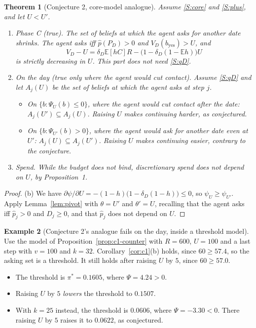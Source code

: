 \documentclass[11pt,a4paper]{article}
\newtheorem{theorem}{Theorem}
\theoremstyle{definition}
\newtheorem{example}[theorem]{Example}
\theoremstyle{remark}
\newcommand{\E}{\mathbb{E}}
\newcommand{\pp}{\hat p}
\begin{document}
\begin{theorem}[Conjecture 2, core-model analogue]\label{thm:c2}
Assume \ref{S:core} and \ref{S:plus}, and let $U<U'$.
\begin{enumerate}[label=(\alph*)]
\item \emph{Phase C (true).} The set of beliefs at which the agent asks for another date shrinks. The agent asks iff $\pp(P_D)>0$ and $V_D(b_{\mathrm{yes}})>U$, and
\[
V_D-U=\delta_D\E[hC]R-\bigl(1-\delta_D(1-\E h)\bigr)U
\]
is strictly decreasing in $U$. This part does not need \ref{S:qD}.
\item \emph{On the day (true only where the agent would cut contact).} Assume \ref{S:qD} and let $A_j(U)$ be the set of beliefs at which the agent asks at step $j$.
\begin{itemize}[nosep]
\item On $\{b:\Psi_U(b)\le0\}$, where the agent would cut contact after the date: $A_j(U')\subseteq A_j(U)$. Raising $U$ makes continuing harder, as conjectured.
\item On $\{b:\Psi_{U'}(b)>0\}$, where the agent would ask for another date even at $U'$: $A_j(U)\subseteq A_j(U')$. Raising $U$ makes continuing \emph{easier}, contrary to the conjecture.
\end{itemize}
\item \emph{Spend.} While the budget does not bind, discretionary spend does not depend on $U$, by Proposition~1.
\end{enumerate}
\end{theorem}

\begin{proof}
(b) We have $\partial\psi/\partial U=-(1-h)\bigl(1-\delta_D(1-h)\bigr)\le0$, so $\psi_U\ge\psi_{U'}$. Apply Lemma~\ref{lem:pivot} with $\theta=U'$ and $\theta'=U$, recalling that the agent asks iff $\pp_j>0$ and $D_j\ge0$, and that $\pp_j$ does not depend on $U$.
\end{proof}

\begin{example}[Conjecture 2's analogue fails on the day, inside a threshold model]\label{ex:c2}
Use the model of Proposition~\ref{prop:c1-counter} with $R=600$, $U=100$ and a last step with $v=100$ and $k=32$. Corollary~\ref{cor:c1}(b) holds, since $60\ge57.4$, so the asking set is a threshold. It still holds after raising $U$ by $5$, since $60\ge57.0$.
\begin{itemize}[nosep]
\item The threshold is $\pi^*=0.1605$, where $\Psi=4.24>0$.
\item Raising $U$ by $5$ \emph{lowers} the threshold to $0.1507$.
\item With $k=25$ instead, the threshold is $0.0606$, where $\Psi=-3.30<0$. There raising $U$ by $5$ raises it to $0.0622$, as conjectured.
\end{itemize}
\end{example}
\end{document}
